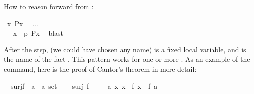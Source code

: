 \begin{isabellebody}
\begin{isamarkuptext}
How to reason forward from :
\end{isamarkuptext}%
%
\isadelimproof
%
\endisadelimproof
%
\isatagproof
{}\isamarkupfalse%
\ {}{}x{}\ P{}x{}{}\ %
\ $\dots$\\
\isamarkupfalse%
\ \isamarkupfalse%
\ x\ \ p{}\ {}P{}x{}{}\ \isamarkupfalse%
\ blast%
\endisatagproof
{\isafoldproof}%
%
\isadelimproof
%
\endisadelimproof
%
\begin{isamarkuptext}%
After the  step,  (we could have chosen any name)
is a fixed local
variable, and  is the name of the fact
.
This pattern works for one or more .
As an example of the  command, here is the proof of
Cantor's theorem in more detail:%
\end{isamarkuptext}%
\isamarkuptrue%
\isamarkupfalse%
\ {}{}\ surj{}f\ {}{}\ {}a\ {}\ {}a\ set{}{}\isanewline
%
\isadelimproof
%
\endisadelimproof
%
\isatagproof
{}\isamarkupfalse%
\isanewline
\ \ \isamarkupfalse%
\ {}surj\ f{}\isanewline
\ \ \isamarkupfalse%
\ \ {}{}a{}\ {}x{}\ x\ {}\ f\ x{}\ {}\ f\ a{}\ \isamarkupfalse%

\end{isabellebody}
